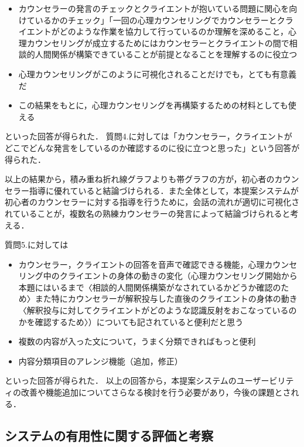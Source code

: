 \documentclass[shuuron]{kuee}
\begin{document}
\begin{itemize}

  \item カウンセラーの発言のチェックとクライエントが抱いている問題に関心を向けているかのチェック」「一回の心理カウンセリングでカウンセラーとクライエントがどのような作業を協力して行っているのか理解を深めること，心理カウンセリングが成立するためにはカウンセラーとクライエントの間で相談的人間関係が構築できていることが前提となることを理解するのに役立つ
  \item 心理カウンセリングがこのように可視化されることだけでも，とても有意義だ
  \item この結果をもとに，心理カウンセリングを再構築するための材料としても使える
\end{itemize}
といった回答が得られた．
質問4.に対しては「カウンセラー，クライエントがどこでどんな発言をしているのか確認するのに役に立つと思った」という回答が得られた．

以上の結果から，積み重ね折れ線グラフよりも帯グラフの方が，初心者のカウンセラー指導に優れていると結論づけられる．また全体として，本提案システムが初心者のカウンセラーに対する指導を行うために，会話の流れが適切に可視化されていることが，複数名の熟練カウンセラーの発言によって結論づけられると考える．

質問5.に対しては

\begin{itemize}

  \item カウンセラー，クライエントの回答を音声で確認できる機能，心理カウンセリング中のクライエントの身体の動きの変化（心理カウンセリング開始から本題にはいるまで〈相談的人間関係構築がなされているかどうか確認のため〉また特にカウンセラーが解釈投与した直後のクライエントの身体の動き〈解釈投与に対してクライエントがどのような認識反射をおこなっているのかを確認するため〉）についても記されていると便利だと思う
  \item 複数の内容が入った文について，うまく分類できればもっと便利
  \item 内容分類項目のアレンジ機能（追加，修正）
\end{itemize}
といった回答が得られた．
以上の回答から，本提案システムのユーザービリティの改善や機能追加についてさらなる検討を行う必要があり，今後の課題とされる．



\subsection{システムの有用性に関する評価と考察}%
\end{document}
